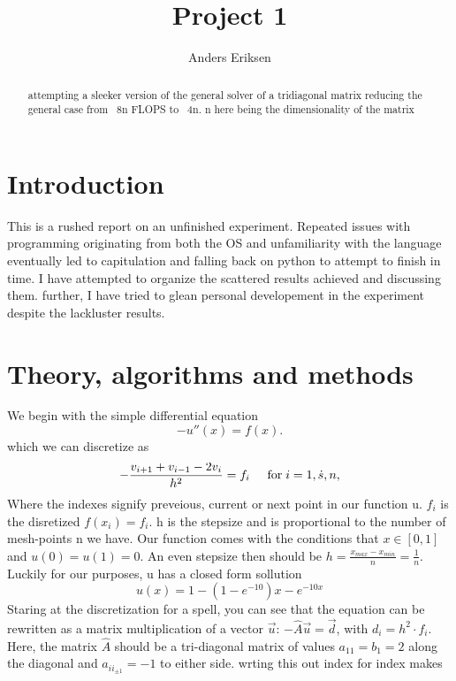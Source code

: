 \documentclass[10pt, twocolumn]{revtex4-1}
\begin{document}
\title{Project 1}
\author{Anders Eriksen}
\begin{abstract}
attempting a sleeker version of the general solver of a tridiagonal matrix reducing the general case from ~8n FLOPS to ~4n. n here being the dimensionality of the matrix
\end{abstract}
\maketitle

\section{Introduction}
This is a rushed report on an unfinished experiment. Repeated issues with programming originating from both the OS and unfamiliarity with the language eventually led to capitulation and falling back on python to attempt to finish in time. I have attempted to organize the scattered results achieved and discussing them. further, I have tried to glean personal developement in the experiment despite the lackluster results. 

\section{Theory, algorithms and methods}
We begin with the simple differential equation 
\begin{equation*}
-u''(x) = f(x).
\end{equation*}
which we can discretize as 
\begin{equation*}
   -\frac{v_{i+1}+v_{i-1}-2v_i}{h^2} = f_i  \hspace{0.5cm} \mathrm{for} \hspace{0.1cm} i=1,\dot    s, n,
\end{equation*}
Where the indexes signify preveious, current or next point in our function u. $f_i$ is the disretized $f(x_i) = f_i$. h is the stepsize and is proportional to the number of mesh-points n we have. Our function comes with the conditions that $x \in [0,1]$ and $u(0)=u(1)=0$. An even stepsize then should be $h = \frac{x_{max}- x_{min}}{n} = \frac{1}{n}$. Luckily for our purposes, u has a closed form sollution 
\begin{equation*}
	u(x) = 1-(1-e^{-10})x-e^{-10x}
\end{equation*}
Staring at the discretization for a spell, you can see that the equation can be rewritten as a matrix multiplication of a vector $\vec{u}$: $-\hat{A}\vec{u}=\vec{d}$, with $d_i = h^2\cdot f_i$.  Here, the matrix $\hat{A}$ should be a tri-diagonal matrix of values $a_{11} = b_1 = 2$ along the diagonal and $a_{ii_{\pm 1}} = -1$ to either side. wrting this out index for index makes
\end{document}
